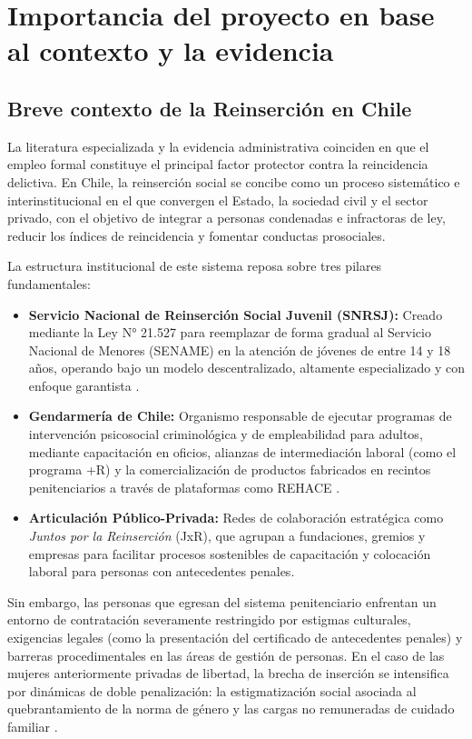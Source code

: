 \section{Importancia del proyecto en base al contexto y la evidencia}

\subsection{Breve contexto de la Reinserción en Chile}
La literatura especializada y la evidencia administrativa coinciden en que el empleo formal constituye el principal factor protector contra la reincidencia delictiva. En Chile, la reinserción social se concibe como un proceso sistemático e interinstitucional en el que convergen el Estado, la sociedad civil y el sector privado, con el objetivo de integrar a personas condenadas e infractoras de ley, reducir los índices de reincidencia y fomentar conductas prosociales.

La estructura institucional de este sistema reposa sobre tres pilares fundamentales:
\begin{itemize}
    \item \textbf{Servicio Nacional de Reinserción Social Juvenil (SNRSJ):} Creado mediante la Ley N° 21.527 para reemplazar de forma gradual al Servicio Nacional de Menores (SENAME) en la atención de jóvenes de entre 14 y 18 años, operando bajo un modelo descentralizado, altamente especializado y con enfoque garantista \parencite{Ley21527CreaElServicioNacionalDeReinsercionJuvenil}.
    \item \textbf{Gendarmería de Chile:} Organismo responsable de ejecutar programas de intervención psicosocial criminológica y de empleabilidad para adultos, mediante capacitación en oficios, alianzas de intermediación laboral (como el programa +R) y la comercialización de productos fabricados en recintos penitenciarios a través de plataformas como REHACE \parencite{EstadisticaGeneralPenitenciaria2026}.
    \item \textbf{Articulación Público-Privada:} Redes de colaboración estratégica como \textit{Juntos por la Reinserción} (JxR), que agrupan a fundaciones, gremios y empresas para facilitar procesos sostenibles de capacitación y colocación laboral para personas con antecedentes penales.
\end{itemize}

Sin embargo, las personas que egresan del sistema penitenciario enfrentan un entorno de contratación severamente restringido por estigmas culturales, exigencias legales (como la presentación del certificado de antecedentes penales) y barreras procedimentales en las áreas de gestión de personas. En el caso de las mujeres anteriormente privadas de libertad, la brecha de inserción se intensifica por dinámicas de doble penalización: la estigmatización social asociada al quebrantamiento de la norma de género y las cargas no remuneradas de cuidado familiar \parencite{CaracterizacionPersonasPrivadas2026}.

